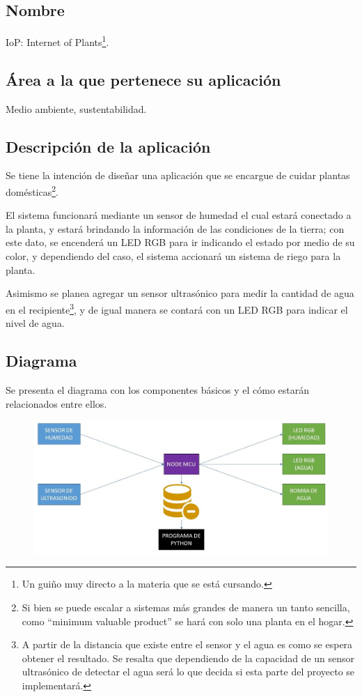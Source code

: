 \documentclass[12pt]{article}
\begin{document}
\subsection{Nombre}
IoP: Internet of Plants\footnote{Un guiño muy directo a la
materia que se está cursando.}.

\subsection{Área a la que pertenece su aplicación}
Medio ambiente, sustentabilidad.

\subsection{Descripción de la aplicación}
Se tiene la intención de diseñar una aplicación que se
encargue de cuidar plantas domésticas\footnote{Si bien se
puede escalar a sistemas más grandes de manera un tanto
sencilla, como ``minimum valuable product'' se hará con solo
una planta en el hogar.}.

El sistema funcionará mediante un sensor de humedad el cual
estará conectado a la planta, y estará brindando la
información de las condiciones de la tierra; con este dato,
se encenderá un LED RGB para ir indicando el estado por
medio de su color, y dependiendo del caso, el sistema
accionará un sistema de riego para la planta.

Asimismo se planea agregar un sensor ultrasónico para
medir la cantidad de agua en el recipiente\footnote{A partir
de la distancia que existe entre el sensor y el agua es como
se espera obtener el resultado. Se resalta que dependiendo
de la capacidad de un sensor ultrasónico de detectar el agua
será lo que decida si esta parte del proyecto se
implementará.}, y de igual manera se contará con un LED RGB
para indicar el nivel de agua.

\subsection{Diagrama}
Se presenta el diagrama con los componentes básicos y el
cómo estarán relacionados entre ellos.

\begin{figure}[!h]
\centering
\includegraphics[width = \textwidth]{diagrama}
\end{figure}
\end{document}
